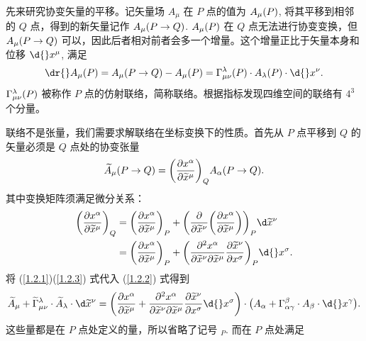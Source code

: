 \documentclass[UTF8, 12pt, a4paper, oneside, onecolumn, fontset=none]{ctexart}
\begin{document}
先来研究协变矢量的平移。记矢量场 $A_{\mu}$ 在 $P$ 点的值为 $A_{\mu}\mleft(P\mright)$, 将其平移到相邻的 $Q$ 点，得到的新矢量记作 $A_{\mu}\mleft(P\to Q\mright)$. $A_{\mu}\mleft(P\mright)$ 在 $Q$ 点无法进行协变变换，但 $A_{\mu}\mleft(P\to Q\mright)$ 可以，因此后者相对前者会多一个增量。这个增量正比于矢量本身和位移 $\d{}x^{\mu}$, 满足
\begin{equation}
\dr{}A_{\mu}\mleft(P\mright)=A_{\mu}\mleft(P\to Q\mright)-A_{\mu}\mleft(P\mright)=\Gamma_{\mu\nu}^{\lambda}\mleft(P\mright)\cdot{}A_{\lambda}\mleft(P\mright)\cdot\d{}x^{\nu}.\label{1.2.1}
\end{equation}
$\Gamma_{\mu\nu}^{\lambda}\mleft(P\mright)$ 被称作 $P$ 点的仿射联络，简称联络。根据指标发现四维空间的联络有 $4^{3}$ 个分量。

联络不是张量，我们需要求解联络在坐标变换下的性质。首先从 $P$ 点平移到 $Q$ 的矢量必须是 $Q$ 点处的协变张量
\begin{equation}
\widetilde{A}_{\mu}\mleft(P\to Q\mright)=\mleft(\frac{\partial{}x^{\alpha}}{\partial\widetilde{x}^{\mu}}\mright)_{Q}A_{\alpha}\mleft(P\to Q\mright).\label{1.2.2}
\end{equation}
其中变换矩阵须满足微分关系：
\begin{align}
\mleft(\frac{\partial{}x^{\alpha}}{\partial\widetilde{x}^{\mu}}\mright)_{Q}&=\mleft(\frac{\partial{}x^{\alpha}}{\partial\widetilde{x}^{\mu}}\mright)_{P}+\mleft(\frac{\partial{}}{\partial\widetilde{x}^{\nu}}\mleft(\frac{\partial{}x^{\alpha}}{\partial\widetilde{x}^{\mu}}\mright)\mright)_{P}\d\widetilde{x}^{\nu}\notag\\
&=\mleft(\frac{\partial{}x^{\alpha}}{\partial\widetilde{x}^{\mu}}\mright)_{P}+\mleft(\frac{\partial{}^{2}x^{\alpha}}{\partial\widetilde{x}^{\nu}\partial\widetilde{x}^{\mu}}\frac{\partial\widetilde{x}^{\nu}}{\partial{}x^{\sigma}}\mright)_{P}\d{}x^{\sigma}.\label{1.2.3}
\end{align}
将 (\ref{1.2.1})(\ref{1.2.3}) 式代入 (\ref{1.2.2}) 式得到
\begin{equation}
\widetilde{A}_{\mu}+\widetilde{\Gamma}_{\mu\nu}^{\lambda}\cdot\widetilde{A}_{\lambda}\cdot\d\widetilde{x}^{\nu}=\mleft(\frac{\partial{}x^{\alpha}}{\partial\widetilde{x}^{\mu}}+\frac{\partial{}^{2}x^{\alpha}}{\partial\widetilde{x}^{\nu}\partial\widetilde{x}^{\mu}}\frac{\partial\widetilde{x}^{\nu}}{\partial{}x^{\sigma}}\d{}x^{\sigma}\mright)\cdot\mleft(A_{\alpha}+\Gamma_{\alpha\gamma}^{\beta}\cdot{}A_{\beta}\cdot\d{}x^{\gamma}\mright).
\end{equation}
这些量都是在 $P$ 点处定义的量，所以省略了记号 ${}_{P}$. 而在 $P$ 点处满足
\end{document}
